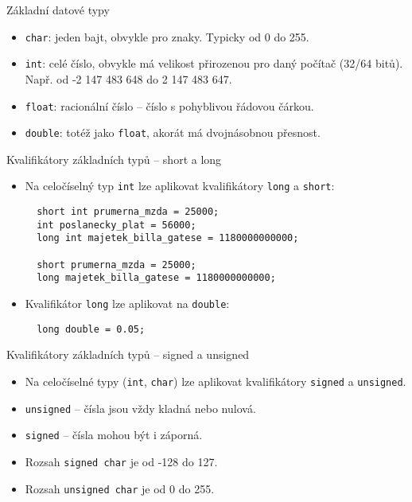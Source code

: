 \documentclass{beamer}
\newenvironment{itemizex}%
  {\large \begin{itemize}%
    \setlength{\itemsep}{8pt}%
    \setlength{\parskip}{8pt}}%
  {\end{itemize}}
\begin{document}
\begin{frame}[t,fragile]{Základní datové typy}
\begin{itemizex}
  \item \texttt{char}: jeden bajt, obvykle pro znaky. Typicky od 0 do 255.
  \item \texttt{int}: celé číslo, obvykle má velikost přirozenou pro daný počítač (32/64 bitů). Např. od -2 147 483 648 do 2 147 483 647.
  \item \texttt{float}: racionální číslo -- číslo s pohyblivou řádovou čárkou.
  \item \texttt{double}: totéž jako \texttt{float}, akorát má dvojnásobnou přesnost.
\end{itemizex}
\end{frame}

\begin{frame}[t,fragile]{Kvalifikátory základních typů -- short a long}
\begin{itemizex}
  \item Na celočíselný typ \texttt{int} lze aplikovat kvalifikátory \texttt{long} a \texttt{short}: 
  \begin{verbatim} 
  short int prumerna_mzda = 25000;
  int poslanecky_plat = 56000;
  long int majetek_billa_gatese = 1180000000000;

  short prumerna_mzda = 25000;
  long majetek_billa_gatese = 1180000000000;
  \end{verbatim}
  \item Kvalifikátor \texttt{long} lze aplikovat na \texttt{double}:
  \begin{verbatim} 
  long double = 0.05;
  \end{verbatim}
\end{itemizex}
\end{frame}


\begin{frame}[t,fragile]{Kvalifikátory základních typů -- signed a unsigned}
\begin{itemizex}
  \item Na celočíselné typy (\texttt{int}, \texttt{char}) lze aplikovat kvalifikátory \texttt{signed} a \texttt{unsigned}.
  \item \texttt{unsigned} -- čísla jsou vždy kladná nebo nulová.
  \item \texttt{signed} -- čísla mohou být i záporná.
  \item Rozsah \texttt{signed char} je od -128 do 127.
  \item Rozsah \texttt{unsigned char} je od 0 do 255.
\end{itemizex}
\end{frame}
\end{document}
